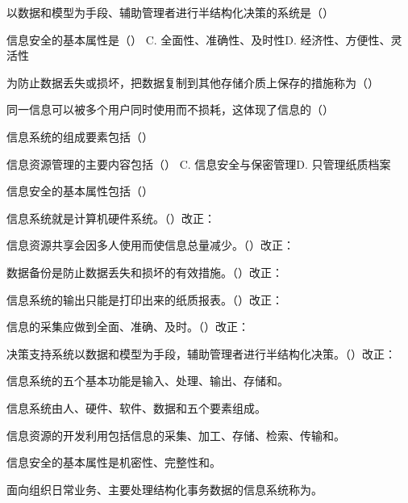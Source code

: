 \documentclass[a4paper,11pt]{article}
\begin{document}
\q 以数据和模型为手段、辅助管理者进行半结构化决策的系统是（\quad）

\q 信息安全的基本属性是（\quad）
{C. 全面性、准确性、及时性}{D. 经济性、方便性、灵活性}

\q 为防止数据丢失或损坏，把数据复制到其他存储介质上保存的措施称为（\quad）

\q 同一信息可以被多个用户同时使用而不损耗，这体现了信息的（\quad）

\q 信息系统的组成要素包括（\quad）

\q 信息资源管理的主要内容包括（\quad）
{C. 信息安全与保密管理}{D. 只管理纸质档案}

\q 信息安全的基本属性包括（\quad）

\q 信息系统就是计算机硬件系统。\quad（\quad）\quad 改正：\fixblank

\q 信息资源共享会因多人使用而使信息总量减少。\quad（\quad）\quad 改正：\fixblank

\q 数据备份是防止数据丢失和损坏的有效措施。\quad（\quad）\quad 改正：\fixblank

\q 信息系统的输出只能是打印出来的纸质报表。\quad（\quad）\quad 改正：\fixblank

\q 信息的采集应做到全面、准确、及时。\quad（\quad）\quad 改正：\fixblank

\q 决策支持系统以数据和模型为手段，辅助管理者进行半结构化决策。\quad（\quad）\quad 改正：\fixblank

\q 信息系统的五个基本功能是输入、处理、输出、存储和\fillblanks[2.2cm]。

\q 信息系统由人、硬件、软件、数据和\fillblanks[2.4cm]五个要素组成。

\q 信息资源的开发利用包括信息的采集、加工、存储、检索、传输和\fillblanks[1.6cm]。

\q 信息安全的基本属性是机密性、完整性和\fillblanks[1.8cm]。

\q 面向组织日常业务、主要处理结构化事务数据的信息系统称为\fillblanks[2.6cm]。
\end{document}
